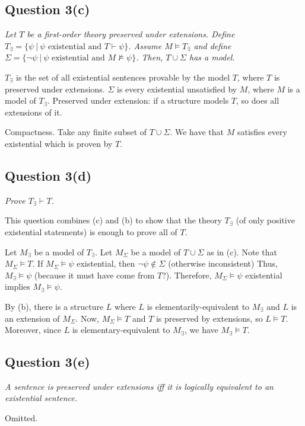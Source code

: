 \documentclass[a4paper]{article}
\begin{document}
\subsection*{Question 3(c)}
\begin{center}
  \textit{Let $T$ be a first-order theory preserved under extensions. Define
    $T_\exists = \{\psi ~|~ \psi\text{ existential and } T \vdash \psi\}$.
    Assume $M \models T_\exists$ and define $\Sigma = \{ \neg \psi ~|~ \psi\text{ existential and }M \nvDash \psi\}$. Then, $T \cup \Sigma$ has a model.
  }
\end{center}
$T_\exists$ is the set of all existential sentences provable by the model $T$,
where $T$ is preserved under extensions.
$\Sigma$ is every existential unsatisfied by $M$,
where $M$ is a model of $T_\exists$.
Preserved under extension: if a structure models $T$, so does
all extensions of it.

Compactness. Take any finite subset of $T \cup \Sigma$.
We have that $M$ satisfies every existential which is proven by $T$. 




\subsection*{Question 3(d)}
\begin{center}
  \textit{Prove $T_\exists \vdash T$.}
\end{center}
\begin{mdframed}
  This question combines (c) and (b)
  to show that the theory $T_\exists$
  (of only positive existential statements)
  is enough to prove
  all of $T$.

  Let $M_\exists$ be a model of $T_\exists$. Let $M_\Sigma$ be a model of $T \cup \Sigma$ as in (c).
  Note that $M_\Sigma \models T$.
  If $M_\Sigma \models \psi$ existential,
  then $\neg \psi \notin \Sigma$ (otherwise inconsistent)
  Thus, $M_\exists \models \psi$ (because it must have come from $T$?).
  Therefore, $M_\Sigma \models \psi$ existential implies $M_\exists \models \psi$.

  By (b), there is a structure $L$ where $L$ is elementarily-equivalent to $M_\exists$
  and $L$ is an extension of $M_\Sigma$.
  Now, $M_\Sigma \models T$ and $T$ is preserved by extensions, so $L \models T$.
  Moreover, since $L$ is elementary-equivalent to $M_\exists$,
  we have $M_\exists \models T$.


\end{mdframed}

\subsection*{Question 3(e)}
\begin{center}
  \textit{A sentence is preserved under extensions iff
  it is logically equivalent to an existential sentence.}
\end{center}
Omitted.
\end{document}
